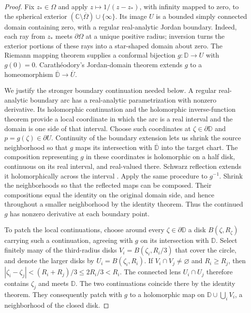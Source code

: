 \documentclass[11pt]{article}
\theoremstyle{remark}\newtheorem{remark}[theorem]{Remark}
\begin{document}
\begin{proof}
Fix $z_*\in\Omega$ and apply $z\mapsto1/(z-z_*)$, with infinity
mapped to zero, to the spherical exterior
$(\mathbb C\setminus\overline\Omega)\cup\{\infty\}$. Its image $U$ is
a bounded simply connected domain containing zero, with a regular
real-analytic Jordan boundary. Indeed, each ray from $z_*$ meets
$\partial\Omega$ at a unique positive radius; inversion turns the
exterior portions of these rays into a star-shaped domain about zero.
The Riemann mapping theorem \cite[Chapter~6, Section~1.1, Theorem~1]{Ahlfors}
supplies a conformal bijection
$g:\mathbb D\to U$ with $g(0)=0$. Carath\'eodory's Jordan-domain theorem
\cite[Chapter~6, Section~1.2]{Ahlfors} extends $g$ to a homeomorphism $\overline{\mathbb D}\to\overline U$.

We justify the stronger boundary continuation needed below. A regular
real-analytic boundary arc has a real-analytic parametrization with
nonzero derivative. Its holomorphic continuation and the holomorphic
inverse-function theorem provide a local coordinate in which the arc
is a real interval and the domain is one side of that interval. Choose
such coordinates at $\zeta\in\partial\mathbb D$ and
$p=g(\zeta)\in\partial U$. Continuity of the boundary extension lets us
shrink the source neighborhood so that $g$ maps its intersection with
$\overline{\mathbb D}$ into the target chart.
The composition representing $g$ in these
coordinates is holomorphic on a half disk, continuous on its real
interval, and real-valued there. Schwarz reflection extends it
holomorphically across the interval
\cite[Chapter~4, Section~6.5; Chapter~6, Sections~1.3--1.4]{Ahlfors}. Apply the same procedure to
$g^{-1}$. Shrink the neighborhoods so that the reflected maps can be
composed. Their compositions equal the identity on the original domain
side, and hence throughout a smaller neighborhood by the identity theorem.
Thus the continued $g$ has nonzero derivative at each boundary point.

To patch the local continuations, choose around every
$\zeta\in\partial\mathbb D$ a disk $B(\zeta,R_\zeta)$ carrying such a continuation, agreeing
with $g$ on its intersection with $\mathbb D$. Select finitely many of
the third-radius disks $V_i=B(\zeta_i,R_i/3)$ that cover the circle,
and denote the larger disks by $U_i=B(\zeta_i,R_i)$. If
$V_i\cap V_j\ne\varnothing$ and $R_i\ge R_j$, then
$|\zeta_i-\zeta_j|<(R_i+R_j)/3\le2R_i/3<R_i$.
The connected lens $U_i\cap U_j$ therefore contains $\zeta_j$ and
meets $\mathbb D$. The two continuations coincide there by the identity
theorem. They consequently patch with $g$ to a holomorphic map on
$\mathbb D\cup\bigcup_iV_i$, a neighborhood of the closed disk.


\end{proof}
\end{document}
